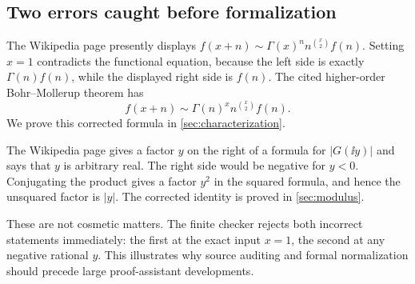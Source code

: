 \subsection{Two errors caught before formalization}

\begin{audit}\label{audit:char}
The Wikipedia page presently displays
\(f(x+n)\sim\Gamma(x)^n n^{\binom{x}{2}}f(n)\).  Setting \(x=1\) contradicts
the functional equation, because the left side is exactly
\(\Gamma(n)f(n)\), while the displayed right side is \(f(n)\).  The cited
higher-order Bohr--Mollerup theorem has
\[
 f(x+n)\sim \Gamma(n)^x n^{\binom{x}{2}}f(n).
\]
We prove this corrected formula in \cref{sec:characterization}.
\end{audit}

\begin{audit}\label{audit:modulus}
The Wikipedia page gives a factor \(y\) on the right of a formula for
\(|G(\ii y)|\) and says that \(y\) is arbitrary real.  The right side would be
negative for \(y<0\).  Conjugating the product gives a factor \(y^2\) in the
squared formula, and hence the unsquared factor is \(|y|\).  The corrected
identity is proved in \cref{sec:modulus}.
\end{audit}

These are not cosmetic matters.  The finite checker rejects both incorrect
statements immediately: the first at the exact input \(x=1\), the second at any
negative rational \(y\).  This illustrates why source auditing and formal
normalization should precede large proof-assistant developments.
